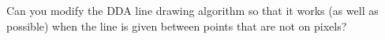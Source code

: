 Can you modify the DDA line drawing algorithm so that it works (as
well as possible) when the line is given between points that are not
on pixels?
